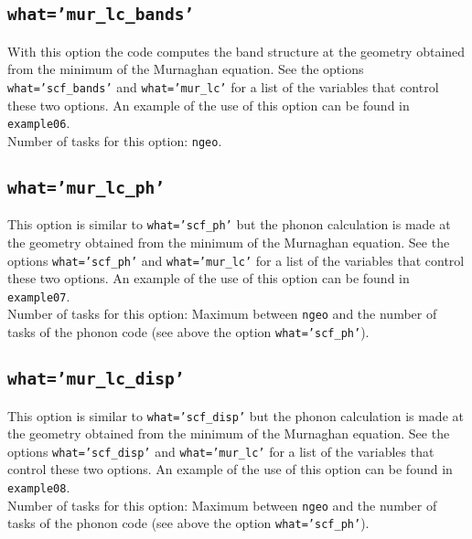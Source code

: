 \documentclass[12pt,a4paper]{article}
\begin{document}
\subsection{\texttt{what='mur\_lc\_bands'}}
With this option the code computes the band structure at the geometry 
obtained from the minimum of the Murnaghan equation. See the options 
\texttt{what='scf\_bands'} and \texttt{what='mur\_lc'} for a list of 
the variables that control these two options. An example of the use of 
this option can be found in \texttt{example06}. \\
Number of tasks for this option: \texttt{ngeo}.

\subsection{\texttt{what='mur\_lc\_ph'}}
This option is similar to \texttt{what='scf\_ph'} but the phonon calculation
is made at the geometry obtained from the minimum of the Murnaghan equation.
See the options \texttt{what='scf\_ph'} and \texttt{what='mur\_lc'} for a
list of the variables that control these two options. 
An example of the use of this option can be found in \texttt{example07}. \\
Number of tasks for this option: Maximum between \texttt{ngeo} and the number
of tasks of the phonon code (see above the option \texttt{what='scf\_ph'}).

\subsection{\texttt{what='mur\_lc\_disp'}}
This option is similar to \texttt{what='scf\_disp'} but the phonon calculation
is made at the geometry obtained from the minimum of the Murnaghan equation.
See the options \texttt{what='scf\_disp'} and \texttt{what='mur\_lc'} for a
list of the variables that control these two options. 
An example of the use of this option can be found in \texttt{example08}. \\
Number of tasks for this option: Maximum between \texttt{ngeo} and the number
of tasks of the phonon code (see above the option \texttt{what='scf\_ph'}).
\end{document}
